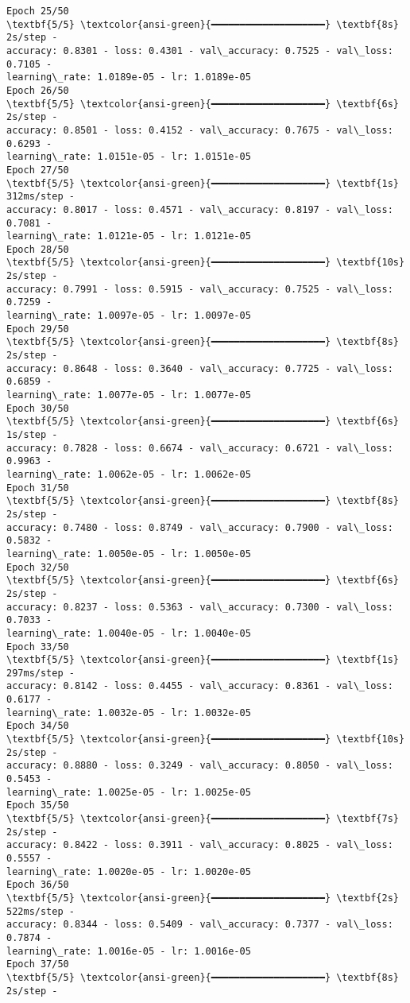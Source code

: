 \documentclass[11pt]{article}
\begin{document}
\begin{Verbatim}[commandchars=\\\{\}]
Epoch 25/50
\textbf{5/5} \textcolor{ansi-green}{━━━━━━━━━━━━━━━━━━━━} \textbf{8s} 2s/step -
accuracy: 0.8301 - loss: 0.4301 - val\_accuracy: 0.7525 - val\_loss: 0.7105 -
learning\_rate: 1.0189e-05 - lr: 1.0189e-05
Epoch 26/50
\textbf{5/5} \textcolor{ansi-green}{━━━━━━━━━━━━━━━━━━━━} \textbf{6s} 2s/step -
accuracy: 0.8501 - loss: 0.4152 - val\_accuracy: 0.7675 - val\_loss: 0.6293 -
learning\_rate: 1.0151e-05 - lr: 1.0151e-05
Epoch 27/50
\textbf{5/5} \textcolor{ansi-green}{━━━━━━━━━━━━━━━━━━━━} \textbf{1s} 312ms/step -
accuracy: 0.8017 - loss: 0.4571 - val\_accuracy: 0.8197 - val\_loss: 0.7081 -
learning\_rate: 1.0121e-05 - lr: 1.0121e-05
Epoch 28/50
\textbf{5/5} \textcolor{ansi-green}{━━━━━━━━━━━━━━━━━━━━} \textbf{10s} 2s/step -
accuracy: 0.7991 - loss: 0.5915 - val\_accuracy: 0.7525 - val\_loss: 0.7259 -
learning\_rate: 1.0097e-05 - lr: 1.0097e-05
Epoch 29/50
\textbf{5/5} \textcolor{ansi-green}{━━━━━━━━━━━━━━━━━━━━} \textbf{8s} 2s/step -
accuracy: 0.8648 - loss: 0.3640 - val\_accuracy: 0.7725 - val\_loss: 0.6859 -
learning\_rate: 1.0077e-05 - lr: 1.0077e-05
Epoch 30/50
\textbf{5/5} \textcolor{ansi-green}{━━━━━━━━━━━━━━━━━━━━} \textbf{6s} 1s/step -
accuracy: 0.7828 - loss: 0.6674 - val\_accuracy: 0.6721 - val\_loss: 0.9963 -
learning\_rate: 1.0062e-05 - lr: 1.0062e-05
Epoch 31/50
\textbf{5/5} \textcolor{ansi-green}{━━━━━━━━━━━━━━━━━━━━} \textbf{8s} 2s/step -
accuracy: 0.7480 - loss: 0.8749 - val\_accuracy: 0.7900 - val\_loss: 0.5832 -
learning\_rate: 1.0050e-05 - lr: 1.0050e-05
Epoch 32/50
\textbf{5/5} \textcolor{ansi-green}{━━━━━━━━━━━━━━━━━━━━} \textbf{6s} 2s/step -
accuracy: 0.8237 - loss: 0.5363 - val\_accuracy: 0.7300 - val\_loss: 0.7033 -
learning\_rate: 1.0040e-05 - lr: 1.0040e-05
Epoch 33/50
\textbf{5/5} \textcolor{ansi-green}{━━━━━━━━━━━━━━━━━━━━} \textbf{1s} 297ms/step -
accuracy: 0.8142 - loss: 0.4455 - val\_accuracy: 0.8361 - val\_loss: 0.6177 -
learning\_rate: 1.0032e-05 - lr: 1.0032e-05
Epoch 34/50
\textbf{5/5} \textcolor{ansi-green}{━━━━━━━━━━━━━━━━━━━━} \textbf{10s} 2s/step -
accuracy: 0.8880 - loss: 0.3249 - val\_accuracy: 0.8050 - val\_loss: 0.5453 -
learning\_rate: 1.0025e-05 - lr: 1.0025e-05
Epoch 35/50
\textbf{5/5} \textcolor{ansi-green}{━━━━━━━━━━━━━━━━━━━━} \textbf{7s} 2s/step -
accuracy: 0.8422 - loss: 0.3911 - val\_accuracy: 0.8025 - val\_loss: 0.5557 -
learning\_rate: 1.0020e-05 - lr: 1.0020e-05
Epoch 36/50
\textbf{5/5} \textcolor{ansi-green}{━━━━━━━━━━━━━━━━━━━━} \textbf{2s} 522ms/step -
accuracy: 0.8344 - loss: 0.5409 - val\_accuracy: 0.7377 - val\_loss: 0.7874 -
learning\_rate: 1.0016e-05 - lr: 1.0016e-05
Epoch 37/50
\textbf{5/5} \textcolor{ansi-green}{━━━━━━━━━━━━━━━━━━━━} \textbf{8s} 2s/step -

\end{Verbatim}
\end{document}
